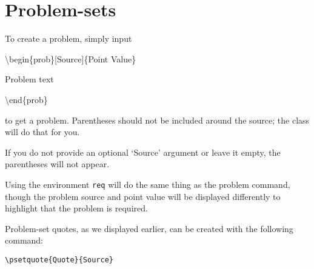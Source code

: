 \documentclass{lucky}
\begin{document}
\pagebreak\section{Problem-sets}



\begin{prob}{2}
To create a problem, simply input

\textbackslash begin\{prob\}[Source]\{Point Value\}

Problem text

\textbackslash end\{prob\}

\noindent to get a problem. Parentheses should not be included around the source; the class will do that for you.
\end{prob}

\begin{prob}{3}
If you do not provide an optional `Source' argument or leave it empty, the parentheses will not appear.
\end{prob}

\begin{req}{6}
Using the environment
\texttt{req}
will do the same thing as the problem command, though the problem source and point value will be displayed differently to highlight that the problem is required.
\end{req}

\begin{req}[Quotes]{13}
Problem-set quotes, as we displayed earlier, can be created with the following command:

\texttt{\textbackslash psetquote\{Quote\}\{Source\}}

\end{req}
\end{document}
